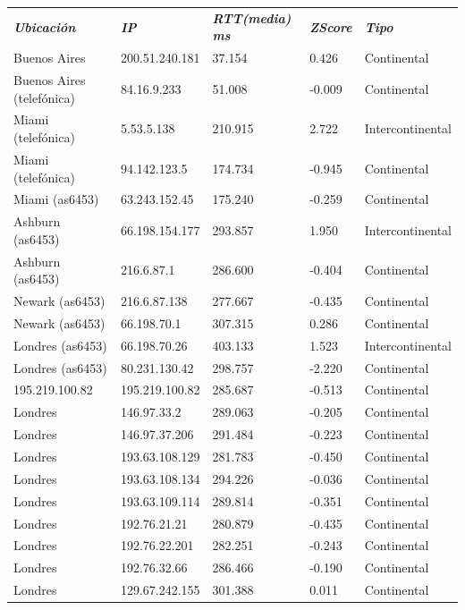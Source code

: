 \begin{tabular}{lllll}
	\textit{\textbf{Ubicaci\'on}}	&	\textit{\textbf{IP}}	&	\textit{\textbf{RTT(media) ms}}	&	\textit{\textbf{ZScore}}	&	\textit{\textbf{Tipo}}	\\
	Buenos Aires			&	200.51.240.181	&	37.154	&	0.426	&	Continental	\\
	Buenos Aires (telef\'onica)	&	84.16.9.233	&	51.008	&	-0.009	&	Continental	\\
	Miami (telef\'onica)		&	5.53.5.138	&	210.915	&	2.722	&	Intercontinental	\\
	Miami (telef\'onica)		&	94.142.123.5	&	174.734	&	-0.945	&	Continental	\\
	Miami (as6453)			&	63.243.152.45	&	175.240	&	-0.259	&	Continental	\\
	Ashburn (as6453)		&	66.198.154.177	&	293.857	&	1.950	&	Intercontinental	\\
	Ashburn (as6453)		&	216.6.87.1	&	286.600	&	-0.404	&	Continental	\\
	Newark (as6453)			&	216.6.87.138	&	277.667	&	-0.435	&	Continental	\\
	Newark (as6453)			&	66.198.70.1	&	307.315	&	0.286	&	Continental	\\
	Londres (as6453)		&	66.198.70.26	&	403.133	&	1.523	&	Intercontinental	\\
	Londres (as6453)		&	80.231.130.42	&	298.757	&	-2.220	&	Continental	\\
	195.219.100.82			&	195.219.100.82	&	285.687	&	-0.513	&	Continental	\\
	Londres				&	146.97.33.2	&	289.063	&	-0.205	&	Continental	\\
	Londres				&	146.97.37.206	&	291.484	&	-0.223	&	Continental	\\
	Londres				&	193.63.108.129	&	281.783	&	-0.450	&	Continental	\\
	Londres				&	193.63.108.134	&	294.226	&	-0.036	&	Continental	\\
	Londres				&	193.63.109.114	&	289.814	&	-0.351	&	Continental	\\
	Londres				&	192.76.21.21	&	280.879	&	-0.435	&	Continental	\\
	Londres				&	192.76.22.201	&	282.251	&	-0.243	&	Continental	\\
	Londres				&	192.76.32.66	&	286.466	&	-0.190	&	Continental	\\
	Londres				&	129.67.242.155	&	301.388	&	0.011	&	Continental	\\

\end{tabular}

